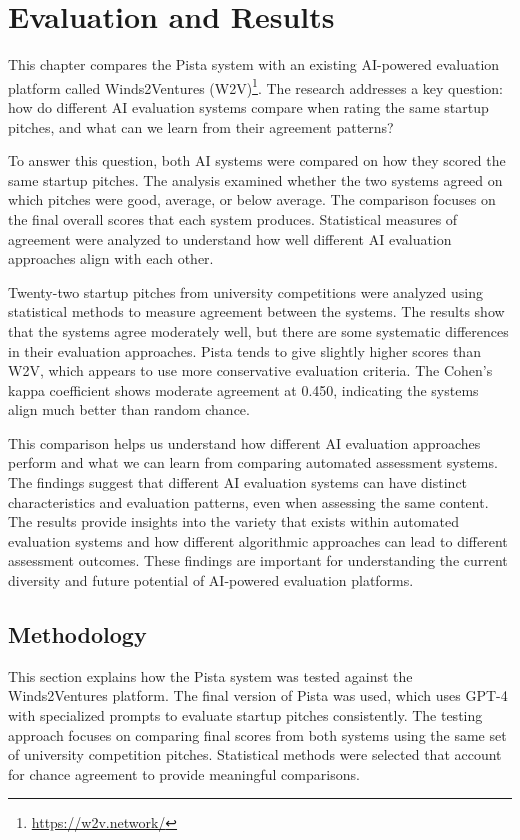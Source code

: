 \chapter{Evaluation and Results}
\label{ch:evaluation}

This chapter compares the Pista system with an existing AI-powered evaluation platform called Winds2Ventures (W2V)\footnote{\url{https://w2v.network/}}. The research addresses a key question: how do different AI evaluation systems compare when rating the same startup pitches, and what can we learn from their agreement patterns?

To answer this question, both AI systems were compared on how they scored the same startup pitches. The analysis examined whether the two systems agreed on which pitches were good, average, or below average. The comparison focuses on the final overall scores that each system produces. Statistical measures of agreement were analyzed to understand how well different AI evaluation approaches align with each other.

Twenty-two startup pitches from university competitions were analyzed using statistical methods to measure agreement between the systems. The results show that the systems agree moderately well, but there are some systematic differences in their evaluation approaches. Pista tends to give slightly higher scores than W2V, which appears to use more conservative evaluation criteria. The Cohen's kappa coefficient shows moderate agreement at 0.450, indicating the systems align much better than random chance.

This comparison helps us understand how different AI evaluation approaches perform and what we can learn from comparing automated assessment systems. The findings suggest that different AI evaluation systems can have distinct characteristics and evaluation patterns, even when assessing the same content. The results provide insights into the variety that exists within automated evaluation systems and how different algorithmic approaches can lead to different assessment outcomes. These findings are important for understanding the current diversity and future potential of AI-powered evaluation platforms.

\section{Methodology}
\label{sec:methodology}

This section explains how the Pista system was tested against the Winds2Ventures platform. The final version of Pista was used, which uses GPT-4 with specialized prompts to evaluate startup pitches consistently. The testing approach focuses on comparing final scores from both systems using the same set of university competition pitches. Statistical methods were selected that account for chance agreement to provide meaningful comparisons.

